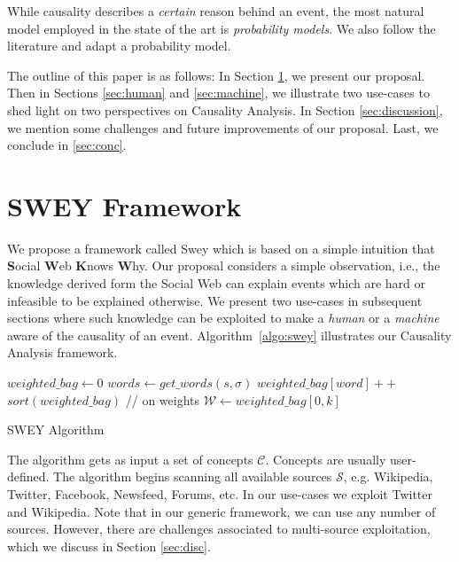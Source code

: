 \documentclass[conference]{IEEEtran}
\begin{document}
While causality describes a {\em certain} reason behind an event, the most natural model employed in the state of the art is {\em probability models}. We also follow the literature \cite{hlavavckova2007causality} and adapt a probability model. 

The outline of this paper is as follows: In Section \ref{sec:proposal}, we present our proposal. Then in Sections \ref{sec:human} and \ref{sec:machine}, we illustrate two use-cases to shed light on two perspectives on Causality Analysis. In Section \ref{sec:discussion}, we mention some challenges and future improvements of our proposal. Last, we conclude in \ref{sec:conc}.

\section{SWEY Framework}
\label{sec:proposal}
We propose a framework called {\sc Swey} which is based on a simple intuition that {\bf S}ocial {\bf W}eb {\bf K}nows {\bf W}hy. Our proposal considers a simple observation, i.e., the knowledge derived form the Social Web can explain events which are hard or infeasible to be explained otherwise. We present two use-cases in subsequent sections where such knowledge can be exploited to make a {\em human} or a {\em machine} aware of the causality of an event. Algorithm~\ref{algo:swey} illustrates our Causality Analysis framework.

\begin{algorithm}
\DontPrintSemicolon
{}
${\mathit weighted\_bag} \gets 0$\;
{
  $words \gets {\mathit get\_words}(s, \sigma)$\;
}
{
  ${\mathit weighted\_bag}[word] ++$\;
}
$sort({\mathit weighted\_bag})$ // on weights\;
${\mathcal W} \gets {\mathit weighted\_bag}[0,k]$\;
\; 
\caption{SWEY Algorithm}
\label{algo:swey}
\end{algorithm}

The algorithm gets as input a set of concepts ${\mathcal C}$. Concepts are usually user-defined. 
The algorithm begins scanning all available sources ${\mathcal S}$, e.g. Wikipedia, Twitter, Facebook, Newsfeed, Forums, etc. In our use-cases we exploit Twitter and Wikipedia. Note that in our generic framework, we can use any number of sources. However, there are challenges associated to multi-source exploitation, which we discuss in Section \ref{sec:disc}.
\end{document}
